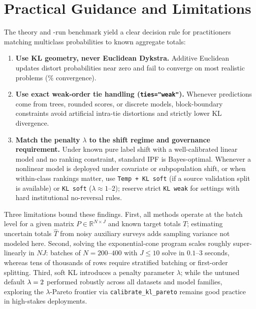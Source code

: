 \documentclass[11pt]{article}
\begin{document}
\section{Practical Guidance and Limitations}

The theory and \NumTotalRealRuns{}-run benchmark yield a clear decision rule for practitioners matching multiclass probabilities to known aggregate totals:
\begin{enumerate}[leftmargin=*,itemsep=2pt]
\item \textbf{Use KL geometry, never Euclidean Dykstra.} Additive Euclidean updates distort probabilities near zero and fail to converge on most realistic problems (\RealEucConvPct\% convergence).
\item \textbf{Use exact weak-order tie handling (\texttt{ties="weak"}).} Whenever predictions come from trees, rounded scores, or discrete models, block-boundary constraints avoid artificial intra-tie distortions and strictly lower KL divergence.
\item \textbf{Match the penalty $\lambda$ to the shift regime and governance requirement.} Under known pure label shift with a well-calibrated linear model and no ranking constraint, standard IPF is Bayes-optimal. Whenever a nonlinear model is deployed under covariate or subpopulation shift, or when within-class rankings matter, use \texttt{Temp + KL soft} (if a source validation split is available) or \texttt{KL soft} ($\lambda \approx 1\text{--}2$); reserve strict \texttt{KL weak} for settings with hard institutional no-reversal rules.
\end{enumerate}

Three limitations bound these findings. First, all methods operate at the batch level for a given matrix $P \in \mathbb{R}^{N \times J}$ and known target totals $T$; estimating uncertain totals $\hat{T}$ from noisy auxiliary surveys adds sampling variance not modeled here. Second, solving the exponential-cone program scales roughly super-linearly in $NJ$: batches of $N=200\text{--}400$ with $J \le 10$ solve in $0.1\text{--}3$ seconds, whereas tens of thousands of rows require stratified batching or first-order splitting. Third, soft KL introduces a penalty parameter $\lambda$; while the untuned default $\lambda=2$ performed robustly across all \NumDatasets{} datasets and \NumModels{} model families, exploring the $\lambda$-Pareto frontier via \texttt{calibrate\_kl\_pareto} remains good practice in high-stakes deployments.

{\small


}
\end{document}
